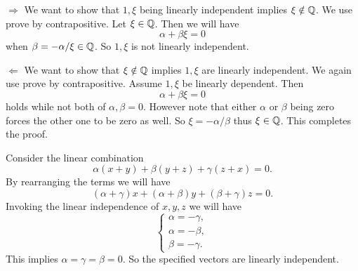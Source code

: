 \begin{problem}
	\begin{solution}
		\noindent $ \boxed{\Rightarrow} $ We want to show that $ 1,\xi $ being linearly independent implies $ \xi \notin \mathbb{Q} $. We use prove by contrapositive. Let $ \xi \in\mathbb{Q} $. Then we will have
		\[ \alpha + \beta \xi = 0 \]
		when $ \beta = -\alpha / \xi \in \mathbb{Q} $. So $ 1,\xi $ is not linearly independent.
		
		\noindent $ \boxed{\Leftarrow} $ We want to show that $ \xi \notin \mathbb{Q} $ implies $ 1,\xi $ are linearly independent. We again use prove by contrapositive. Assume $ 1,\xi $ be linearly dependent. Then
		\[ \alpha  + \beta \xi = 0 \]
		holds while not both of $ \alpha,\beta = 0 $. However note that either $ \alpha $ or $ \beta $ being zero forces the other one to be zero as well. So $ \xi = -\alpha/\beta $ thus $ \xi \in \mathbb{Q} $. This completes the proof.
	\end{solution}
\end{problem}

\begin{problem}
	\begin{solution}
		Consider the linear combination
		\[ \alpha (x+y) + \beta (y+z) + \gamma (z+x) = 0. \]
		By rearranging the terms we will have
		\[ (\alpha + \gamma) x + (\alpha + \beta) y + (\beta + \gamma)z = 0. \]
		Invoking the linear independence of $ x,y,z $ we will have
		\[ \begin{cases}
			\alpha = -\gamma ,\\
			\alpha = -\beta, \\
			\beta = -\gamma.
		\end{cases} \]
		This implies $ \alpha = \gamma = \beta = 0 $. So the specified vectors are linearly independent.
	\end{solution}
\end{problem}


